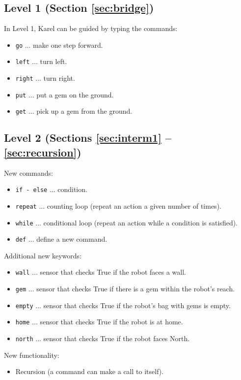 \subsection{Level 1 (Section \ref{sec:bridge})}

In Level 1, Karel can be guided by typing the commands:
\begin{itemize}
\item {\tt go} ... make one step forward.
\item {\tt left} ... turn left.
\item {\tt right} ... turn right.
\item {\tt put} ... put a gem on the ground.
\item {\tt get} ... pick up a gem from the ground.
\end{itemize}

\subsection{Level 2 (Sections \ref{sec:interm1} -- \ref{sec:recursion})}

New commands:
\begin{itemize}
\item {\tt if - else} ... condition.
\item {\tt repeat} ... counting loop (repeat an action a given number of times).
\item {\tt while} ... conditional loop (repeat an action while a condition is satisfied).
\item {\tt def} ... define a new command.
\end{itemize}
Additional new keywords:
\begin{itemize}
\item {\tt wall} ... sensor that checks True if the robot faces a wall.
\item {\tt gem} ... sensor that checks True if there is a gem within the robot's reach.
\item {\tt empty} ... sensor that checks True if the robot's bag with gems is empty.
\item {\tt home} ... sensor that checks True if the robot is at home.
\item {\tt north} ... sensor that checks True if the robot faces North.
\end{itemize}
New functionality:
\begin{itemize}
\item Recursion (a command can make a call to itself).
\end{itemize}

